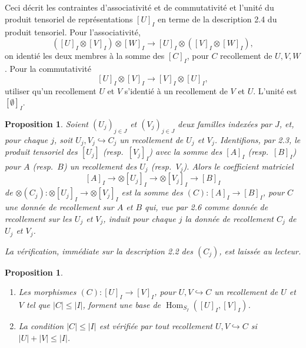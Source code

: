 \documentclass[11pt,a4paper]{article}
\theoremstyle{plain}
\newtheorem{proposition}[theorem]{Proposition}
\theoremstyle{definition}
\DeclareMathOperator{\Hom}{Hom}
\newcommand{\inj}{\hookrightarrow}
\begin{document}
\subsection{}
Ceci d\'ecrit les contraintes d'associativit\'e et de commutativit\'e et l'unit\'e du produit tensoriel de repr\'esentations $[U]_I$ en terme de la description 2.4 du produit tensoriel. Pour l'associativit\'e,
\[
([U]_I \otimes [V]_I) \otimes [W]_I \to [U]_I \otimes ([V]_I \otimes [W]_I),
\]
on identi\'e les deux membres \`a la somme des $[C]_I$, pour $C$ recollement de $U, V, W$. Pour la commutativit\'e
\[
[U]_I \otimes [V]_I \to [V]_I \otimes [U]_I,
\]
utiliser qu'un recollement $U$ et $V$ s'identi\'e \`a un recollement de $V$ et $U$. L'unit\'e est $[\emptyset]_I$.


\begin{proposition}
Soient $(U_j)_{j \in J}$ et $(V_j)_{j \in J}$ deux familles index\'ees par $J$, et, pour chaque $j$, soit $U_j, V_j \inj C_j$ un recollement de $U_j$ et $V_j$. Identifions, par 2.3, le produit tensoriel des $[U_j]$ (resp.~$[V_j]_I$) avec la somme des $[A]_I$ (resp.~$[B]_I$) pour $A$ (resp.~$B$) un recollement des $U_j$ (resp.~$V_j$). Alors le coefficient matriciel
\[
[A]_I \to \otimes [U_j]_I \to \otimes [V_j]_I \to [B]_I
\]
de $\otimes (C_j) : \otimes [U_j]_I \to \otimes [V_j]_I$ est la somme des $(C) : [A]_I \to [B]_I$, pour $C$ une donn\'ee de recollement sur $A$ et $B$ qui, vue par 2.6 comme donn\'ee de recollement sur les $U_j$ et $V_j$, induit pour chaque $j$ la donn\'ee de recollement $C_j$ de $U_j$ et $V_j$.

La v\'erification, imm\'ediate sur la description 2.2 des $(C_j)$, est laiss\'ee au lecteur.
\end{proposition}

\begin{proposition}
\begin{enumerate}[label=(\roman*)]
\item Les morphismes $(C) : [U]_I \to [V]_I$, pour $U, V \inj C$ un recollement de $U$ et $V$ tel que $|C| \leq |I|$, forment une base de $\Hom_{S_I}([U]_I, [V]_I)$.
\item La condition $|C| \leq |I|$ est v\'erifi\'ee par tout recollement $U, V \inj C$ si $|U| + |V| \leq |I|$.
\end{enumerate}
\end{proposition}
\end{document}
